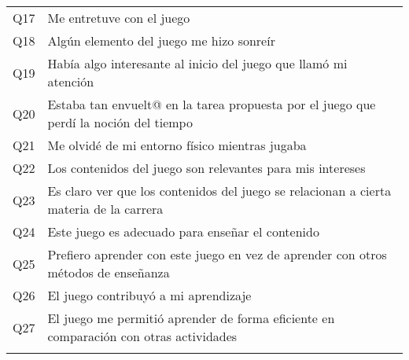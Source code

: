 \begin{table}[h]
\begin{tabular}{|c|l|}
Q17      & Me entretuve con el juego \\
Q18      & Algún elemento del juego me hizo sonreír \\
Q19      & Había algo interesante al inicio del juego que llamó mi atención \\
Q20      & Estaba tan envuelt@ en la tarea propuesta por el juego que perdí la noción del tiempo \\
Q21      & Me olvidé de mi entorno físico mientras jugaba \\
Q22      & Los contenidos del juego son relevantes para mis intereses \\
Q23      & Es claro ver que los contenidos del juego se relacionan a cierta materia de la carrera \\
Q24      & Este juego es adecuado para enseñar el contenido \\
Q25      & Prefiero aprender con este juego en vez de aprender con otros métodos de enseñanza \\
Q26      & El juego contribuyó a mi aprendizaje \\
Q27      & El juego me permitió aprender de forma eficiente en comparación con otras actividades \\
& \\
\hline
\end{tabular}
\end{table}

\restoregeometry
